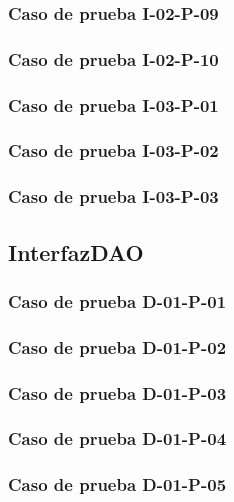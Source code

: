 \documentclass[10pt,a4paper]{article}
\begin{document}
			\subsubsection{Caso de prueba I-02-P-09}

			\subsubsection{Caso de prueba I-02-P-10}

			\subsubsection{Caso de prueba I-03-P-01}

			\subsubsection{Caso de prueba I-03-P-02}

			\subsubsection{Caso de prueba I-03-P-03}

	\subsection{InterfazDAO}
			\subsubsection{Caso de prueba D-01-P-01}

			\subsubsection{Caso de prueba D-01-P-02}

			\subsubsection{Caso de prueba D-01-P-03}

			\subsubsection{Caso de prueba D-01-P-04}

			\subsubsection{Caso de prueba D-01-P-05}
\end{document}
